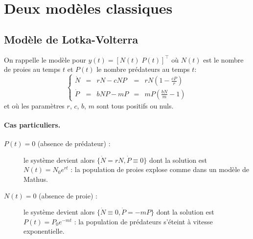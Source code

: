 \section{Deux modèles classiques}


\subsection{Modèle de Lotka-Volterra}

On rappelle le modèle pour $y(t) = [N(t) \; P(t)]^\top$ où $N(t)$ est le nombre de proies au temps $t$ et $P(t)$ le nombre prédateurs au temps $t$:
$$
\left\{ \begin{array}{rclcl} 
  \dot N & = & r N - c N P & = & \displaystyle{r N \left( 1 - \frac{cP}r \right)} \\
  \dot P & = & b N P  - m P & = & \displaystyle{m P \left( \frac{bN}m - 1 \right)} 
\end{array} \right.
$$
et où les paramètres $r$, $c$, $b$, $m$ sont tous positifs ou nuls.

\paragraph*{Cas particuliers.}
\begin{description}
  \item[$P(t) = 0 $ (absence de prédateur) :] le système devient alors $\{\dot N = r N, \dot P \equiv 0\}$ dont la solution est $N(t) = N_0 e^{rt}$ : la population de proies explose comme dans un modèle de Mathus.
  \item[$N(t) = 0 $ (absence de proie) :] le système devient alors $\{\dot N \equiv 0, \dot P = - m P\}$ dont la solution est $P(t) = P_0 e^{-mt}$ : la population de prédateurs s'éteint à vitesse exponentielle.
\end{description}

